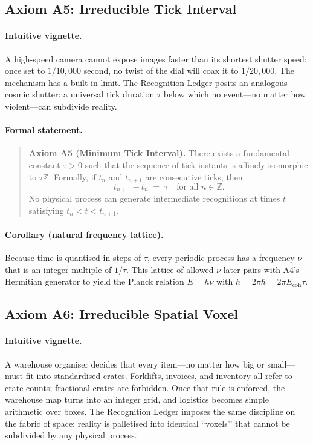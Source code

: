 \documentclass[11pt]{article}
\begin{document}
\subsection{Axiom A5: Irreducible Tick Interval}
\label{subsec:axiom-a5}

\paragraph{Intuitive vignette.}
A high-speed camera cannot expose images faster than its shortest shutter speed: once set to \(1/10{,}000\) second, no twist of the dial will coax it to \(1/20{,}000\).  The mechanism has a built-in limit.  The Recognition Ledger posits an analogous cosmic shutter: a universal tick duration \(\tau\) below which no event—no matter how violent—can subdivide reality.

\paragraph{Formal statement.}
\begin{quote}
\textbf{Axiom A5 (Minimum Tick Interval).}  
There exists a fundamental constant \(\tau > 0\) such that the sequence of tick instants is affinely isomorphic to \(\tau \mathbb{Z}\).  Formally, if \(t_{n}\) and \(t_{n+1}\) are consecutive ticks, then
\[
t_{n+1} - t_{n} \;=\; \tau
\quad\text{for all } n\in\mathbb{Z}.
\]
No physical process can generate intermediate recognitions at times \(t\) satisfying \(t_{n} < t < t_{n+1}\).
\end{quote}

\paragraph{Corollary (natural frequency lattice).}
Because time is quantised in steps of \(\tau\), every periodic process has a frequency \(\nu\) that is an integer multiple of \(1/\tau\).  This lattice of allowed \(\nu\) later pairs with A4’s Hermitian generator to yield the Planck relation \(E = h\nu\) with \(h = 2\pi\hbar = 2\pi E_{\text{coh}}\tau\).

\subsection{Axiom A6: Irreducible Spatial Voxel}
\label{subsec:axiom-a6}

\paragraph{Intuitive vignette.}
A warehouse organiser decides that every item—no matter how big or small—must fit into standardised crates.  Forklifts, invoices, and inventory all refer to crate counts; fractional crates are forbidden.  Once that rule is enforced, the warehouse map turns into an integer grid, and logistics becomes simple arithmetic over boxes.  The Recognition Ledger imposes the same discipline on the fabric of space: reality is palletised into identical “voxels’’ that cannot be subdivided by any physical process.
\end{document}
